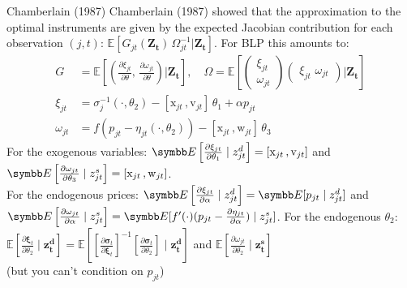 \documentclass[aspectratio=169,10pt]{beamer}
\begin{document}
\begin{frame}{Chamberlain (1987)}
Chamberlain (1987) showed that the approximation to the optimal instruments are given by the expected Jacobian contribution for each observation $(j,t)$: $\mathbb{E}[G_{jt}(\symbf{Z_t})\, \Omega_{jt}^{-1} | \symbf{Z_t}]$. For BLP this amounts to:
\begin{align*}
    G&=\mathbb{E}\left[
    \left(\frac{\partial \xi_{jt}}{\partial \theta}, \,
    \frac{\partial \omega_{jt}}{\partial \theta} \right)
| \symbf{Z_t} \right], \quad 
\Omega = \mathbb{E}\left[
\begin{pmatrix}
    \xi_{jt} \\
    \omega_{jt}
\end{pmatrix}
\begin{pmatrix}
    \xi_{jt}\, \,
    \omega_{jt}
\end{pmatrix}
| \symbf{Z_t} \right] \\
\xi_{jt} &= \sigma_j^{-1}(\cdot, \theta_2) - [\mathrm{x}_{jt} \,,  \mathrm{v}_{jt}]\, \theta_1 + \alpha p_{jt}\\
\omega_{jt} &= f\left(p_{jt}- \eta_{jt}(\cdot, \theta_2)  \right) -[\mathrm{x}_{jt} \,, \mathrm{w}_{jt}]\, \theta_3 
\end{align*}
For the exogenous variables: $\E\left[\frac{\partial \xi_{jt}}{\partial \theta_1} \mid  z_{jt}^{d} \right]=[\mathrm{x}_{jt} \,,  \mathrm{v}_{jt}]$ and
$\E\left[\frac{\partial \omega_{jt}}{\partial \theta_3} \mid  z_{jt}^{s} \right]=[\mathrm{x}_{jt} \,,  \mathrm{w}_{jt}]$.\\
For the endogenous prices: $\E\left[\frac{\partial \xi_{jt}}{\partial \alpha} \mid  z_{jt}^{d} \right]=\E[p_{jt} \mid z_{jt}^d]$ and
$\E\left[\frac{\partial \omega_{jt}}{\partial \alpha} \mid  z_{jt}^{s} \right]=\E[f'(\cdot) (p_{jt} - \frac{\partial \eta_{jt}}{\partial \alpha}) \mid z_{jt}^s]$.
For the endogenous $\theta_2$: $\mathbb{E}\left[\frac{\partial \symbf{\xi}_{t}}{\partial \theta_2} \mid \symbf{z_{t}^d} \right] 
=\mathbb{E}\left[\left[\frac{\partial \symbf{\sigma}_{t}}{\partial \symbf{\xi}_t}\right]^{-1} 
\left[\frac{\partial \symbf{\sigma}_{t}}{\partial \theta_2}\right] \mid \symbf{z_{t}^d} \right]$ and $\mathbb{E}\left[\frac{\partial \omega_{jt}}{\partial \theta_2} \mid \symbf{z_{t}^s} \right]$\\ (but you can't condition on $p_{jt}$)
\end{frame}
\end{document}
